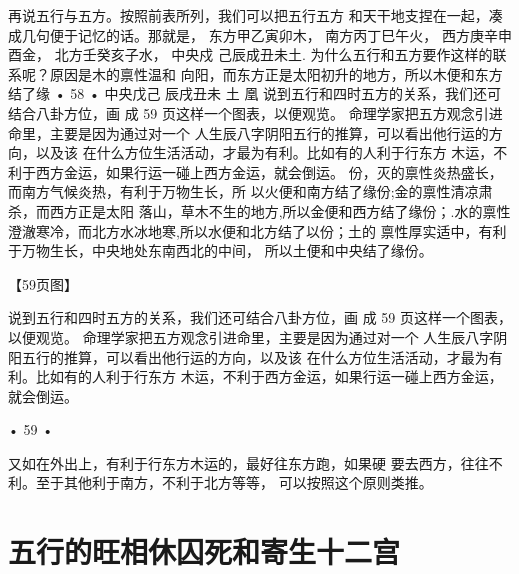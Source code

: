 再说五行与五方。按照前表所列，我们可以把五行五方
和天干地支捏在一起，凑成几句便于记忆的话。那就是，
东方甲乙寅卯木，
南方丙丁巳午火，
西方庚辛申酉金，
北方壬癸亥子水，
中央戍 己辰成丑未土.
为什么五行和五方要作这样的联系呢？原因是木的禀性温和
向阳，而东方正是太阳初升的地方，所以木便和东方结了缘
• 58 •
中央戊己
辰戌丑未
土
凰
说到五行和四时五方的关系，我们还可结合八卦方位，画
成 59 页这样一个图表，以便观览。
命理学家把五方观念引进命里，主要是因为通过对一个
人生辰八字阴阳五行的推算，可以看出他行运的方向，以及该
在什么方位生活活动，才最为有利。比如有的人利于行东方
木运，不利于西方金运，如果行运一碰上西方金运，就会倒运。
份，灭的禀性炎热盛长，而南方气候炎热，有利于万物生长，所
以火便和南方结了缘份;金的禀性清凉肃杀，而西方正是太阳
落山，草木不生的地方,所以金便和西方结了缘份；.水的禀性
澄澈寒冷，而北方水冰地寒,所以水便和北方结了以份；土的
禀性厚实适中，有利于万物生长，中央地处东南西北的中间，
所以土便和中央结了缘份。

【59页图】

说到五行和四时五方的关系，我们还可结合八卦方位，画
成 59 页这样一个图表，以便观览。
命理学家把五方观念引进命里，主要是因为通过对一个
人生辰八字阴阳五行的推算，可以看出他行运的方向，以及该
在什么方位生活活动，才最为有利。比如有的人利于行东方
木运，不利于西方金运，如果行运一碰上西方金运，就会倒运。

• 59 •

又如在外出上，有利于行东方木运的，最好往东方跑，如果硬
要去西方，往往不利。至于其他利于南方，不利于北方等等，
可以按照这个原则类推。

\section{五行的旺相休囚死和寄生十二宫}

